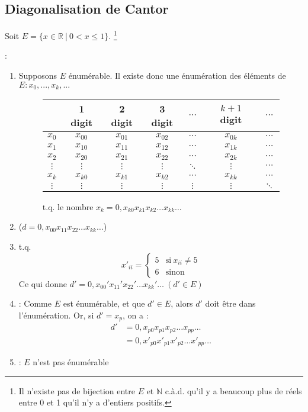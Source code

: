 \subsection{Diagonalisation de Cantor}

Soit $E = \{x \in \mathbb{R} \ | \ 0 < x \leq 1\}$. \footnote{Il n'existe pas de bijection entre $E$ et $\mathbb{N}$ c.à.d. qu'il y a beaucoup plus de réels entre 0 et 1 qu'il n'y a d'entiers positifs.}

 :
\begin{enumerate}
\item Supposons $E$ énumérable. Il existe donc une énumération des éléments de $E : x_0, ..., x_k, ...$
\begin{figure}[H]
    	\centering
    	\begin{tabular}{c|cccccc}
	 & 1 digit & 2 digit & 3 digit & $\cdots$ & $k+1$ digit & $\cdots$ \\ 
	\hline 
	$x_0$ & $x_{00}$ & $x_{01}$ & $x_{02}$ & $\cdots$ & $x_{0k}$ & $\cdots$ \\ 
	$x_1$ & $x_{10}$ & $x_{11}$ & $x_{12}$ & $\cdots$ & $x_{1k}$ & $\cdots$ \\ 
	$x_2$ & $x_{20}$ & $x_{21}$ & $x_{22}$ & $\cdots$ & $x_{2k}$ & $\cdots$ \\ 
	$\vdots$ & $\vdots$ & $\vdots$ & $\vdots$ & $\ddots$ & $\vdots$ & $\cdots$ \\ 
	$x_k$ & $x_{k0}$ & $x_{k1}$ & $x_{k2}$ & $\cdots$ & $x_{kk}$ & $\cdots$ \\ 
	$\vdots$ & $\vdots$ & $\vdots$ & $\vdots$ & $\vdots$ & $\vdots$ & $\ddots$ \\ 
	\end{tabular}
	\caption{ t.q. le nombre $x_k = 0,x_{k0} x_{k1} x_{k2} \ldots x_{kk} \ldots$}
\end{figure}
\item {} ($d = 0,x_{00} x_{11} x_{22} \ldots x_{kk} \ldots$)
\item {} t.q.
\begin{equation*}
	x'_{ii}=
	\begin{cases}
      	5 & \text{si}\ x_{ii} \neq 5 \\
      	6 & \text{sinon}
    \end{cases}
\end{equation*}
Ce qui donne $d' =  0,x_{00}' x_{11}' x_{22}' \ldots x_{kk}' \ldots \ (d' \in E)$
\item {} : Comme $E$ est énumérable, et que $d' \in E$, alors $d'$ doit être dans l'énumération. Or, si $d' = x_p$, on a :
\begin{align*}
	d' &= 0,x_{p0} x_{p1} x_{p2} \ldots x_{pp} \ldots\\
	   &= 0,x'_{p0} x'_{p1} x'_{p2} \ldots x'_{pp} \ldots
\end{align*}
\item {} : $E$ n'est pas énumérable
\end{enumerate}

